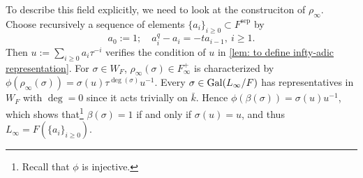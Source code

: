 \documentclass{article}
\newcommand{\sep}{\mathrm{sep}}
\begin{document}
To describe this field explicitly, we need to look at the construciton of $\rho_\infty$.
Choose recursively a sequence of elements $\{a_i\}_{i\ge 0}\subset F^\sep$ by\[a_0 := 1;\quad a_i^q - a_i = -ta_{i-1},\ i\ge 1.\]
Then $u := \sum_{i\ge 0}a_i\tau^{-i}$ verifies the condition of $u$ in \cref{lem: to define infty-adic representation}.
For $\sigma\in W_F$, $\rho_\infty(\sigma)\in F_\infty^+$ is characterized by $\phi(\rho_\infty(\sigma)) = \sigma(u)\tau^{\deg(\sigma)} u^{-1}$.
Every $\sigma\in\operatorname{Gal}(L_\infty/F)$ has representatives in $W_F$ with $\deg = 0$ since it acts trivially on $\bar{k}$.
Hence $\phi(\beta(\sigma)) = \sigma(u)u^{-1}$,
which shows that\footnote{Recall that $\phi$ is injective.} $\beta(\sigma) = 1$ if and only if $\sigma(u) = u$,
and thus $L_\infty = F\left( \{a_i\}_{i\ge 0} \right)$.
\end{document}
